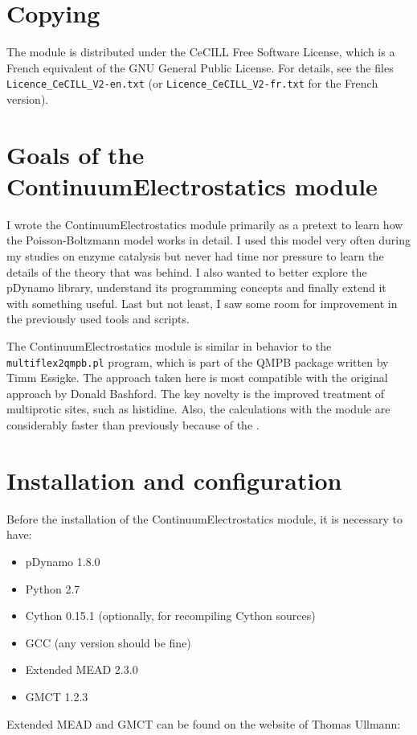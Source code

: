 \documentclass[a4paper,11pt]{article}
\newcommand{\modulename}{ContinuumElectrostatics\xspace}
\begin{document}
\section{Copying}
The module is distributed under the CeCILL Free Software License, which is
a French equivalent of the GNU General Public License.
%
For details, see the files \texttt{Licence\_CeCILL\_V2-en.txt} (or
\texttt{Licence\_CeCILL\_V2-fr.txt} for the French version).


\section{Goals of the \modulename module}
I wrote the \modulename module primarily as a pretext to learn how
the Poisson-Boltzmann model works in detail.
%
I used this model very often during my studies on enzyme catalysis but never had
time nor pressure to learn the details of the theory that was behind.
%
I also wanted to better explore the pDynamo library, understand its programming
concepts and finally extend it with something useful.
%
Last but not least, I saw some room for improvement in the previously used
tools and scripts.

The \modulename module is similar in behavior to the \texttt{multiflex2qmpb.pl}
program, which is part of the QMPB package written by Timm Essigke\cite{Essigke_PhD}.
%
The approach taken here is most compatible with the original approach
by Donald Bashford\cite{Bashford1992}.
%
The key novelty is the improved treatment of multiprotic sites, 
such as histidine.
%
Also, the calculations with the \makebox{\modulename} module are considerably faster 
than previously because of the .

%


\section{Installation and configuration}
Before the installation of the \modulename module, it is necessary
to have:
\begin{itemize}
  \setlength{\itemsep}{2pt}
  \item pDynamo 1.8.0
  \item Python 2.7
  \item Cython 0.15.1 (optionally, for recompiling Cython sources)
  \item GCC (any version should be fine)
  \item Extended MEAD 2.3.0
  \item GMCT 1.2.3
\end{itemize}
%
Extended MEAD and GMCT can be found on the website of Thomas Ullmann:
\end{document}
